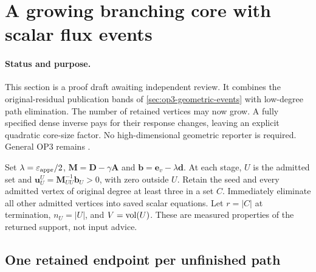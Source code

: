 \section{A growing branching core with scalar flux events}
\label{sec:op3-branch-core-flux}

\paragraph{Status and purpose.}
This section is a \statusproved{} proof draft awaiting independent review.
It combines the original-residual publication bands of
\cref{sec:op3-geometric-events} with low-degree path elimination.
The number of retained vertices may now grow. A fully specified dense
inverse pays for their response changes, leaving an explicit quadratic
core-size factor. No high-dimensional geometric reporter is required.
General OP3 remains \statusopen.

Set $\lambda=\varepsilon_{\mathrm{appr}}/2$, $\bm M=\bm D-\gamma\bm A$ and
$\bm b=\bm e_v-\lambda\bm d$. At each stage, $U$ is the admitted set
and $\bm u^U_U=\bm M_{UU}^{-1}\bm b_U>0$, with zero outside $U$.
Retain the seed and every admitted vertex of original degree at least three
in a set $C$. Immediately eliminate all other admitted vertices into saved
scalar equations. Let $r=|C|$ at termination, $n_U=|U|$, and $V=\operatorname{vol}(U)$.
These are measured properties of the returned support, not input advice.

\subsection{One retained endpoint per unfinished path}

